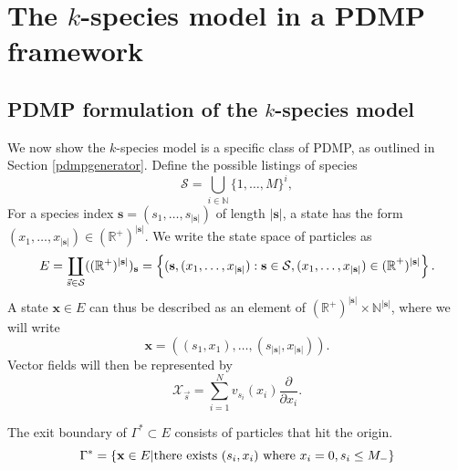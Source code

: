 













\section{The $k$-species model in a PDMP framework}\label{itsapdmp}
\subsection{PDMP formulation of  the $k$-species model} 
We now show the $k$-species model is a specific class of PDMP, as outlined in Section \ref{pdmpgenerator}. Define the possible listings of species
\begin{equation}
 \mathcal S= \bigcup_{i \in \mathbb N}\{1, \dots, M\}^{i},
 \end{equation}   For a species index $\mathbf { s} = (s_{1},\dots, s_{|\mathbf s|})$ of length $|\mathbf s|$, a state has the form $(x_1, \dots, x_{|\mathbf s|})\in (\mathbb{R}^+)^{|\mathbf s|}$. 
 We write the state space of particles as    
\begin{equation}
E =\coprod_{\vec s \in \mathcal S } ((\mathbb{R}^+)^{|\mathbf s|})_\mathbf s = \left\{(\textbf s,(x_{1}, \dots, x_{|\mathbf s|}):\textbf s \in \mathcal S, (x_{1}, \dots, x_{|\mathbf s|})\in \mathbb{(R}^+)^{|\mathbf s|}\right\}.  
\end{equation}
A state $\textbf{x} \in E$ can thus be described as an element of  $(\mathbb{R}^+)^{|\mathbf s|}\times \mathbb N^{|\mathbf s|}$, where we will write
\begin{equation}
\textbf{x} = \left((s_{1},x_1), \dots, (s_{|\mathbf s|},x_{|\mathbf s|})\right).
\end{equation} 
Vector fields will then be represented by  
\begin{equation}
\mathcal X_{\vec s} = \sum_{i = 1}^{N} v_{s_i}(x_i)\frac{\partial}{\partial x_i}.
\end{equation}


   The exit boundary of $\Gamma^*\subset E$ consists of  particles that hit the origin.
\begin{equation}
\Gamma^* = \{\mathbf x\in E| \hbox{there exists }  (s_i,x_i) \hbox{ where }   x_i = 0, s_i\le M_-\} 
\end{equation}

